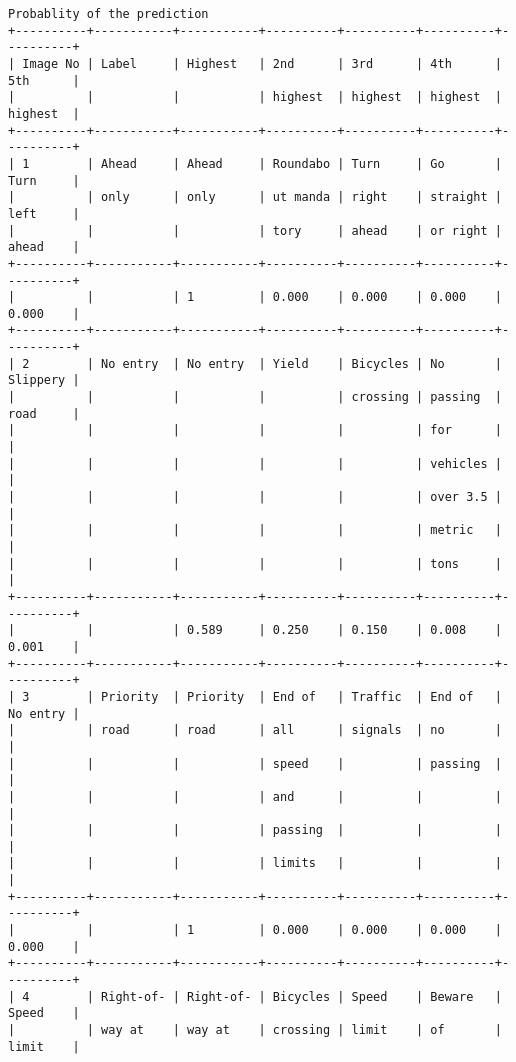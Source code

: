 \documentclass[11pt]{article}
\begin{document}
    \begin{Verbatim}[commandchars=\\\{\}]
Probablity of the prediction
+----------+-----------+-----------+----------+----------+----------+----------+
| Image No | Label     | Highest   | 2nd      | 3rd      | 4th      | 5th      |
|          |           |           | highest  | highest  | highest  | highest  |
+----------+-----------+-----------+----------+----------+----------+----------+
| 1        | Ahead     | Ahead     | Roundabo | Turn     | Go       | Turn     |
|          | only      | only      | ut manda | right    | straight | left     |
|          |           |           | tory     | ahead    | or right | ahead    |
+----------+-----------+-----------+----------+----------+----------+----------+
|          |           | 1         | 0.000    | 0.000    | 0.000    | 0.000    |
+----------+-----------+-----------+----------+----------+----------+----------+
| 2        | No entry  | No entry  | Yield    | Bicycles | No       | Slippery |
|          |           |           |          | crossing | passing  | road     |
|          |           |           |          |          | for      |          |
|          |           |           |          |          | vehicles |          |
|          |           |           |          |          | over 3.5 |          |
|          |           |           |          |          | metric   |          |
|          |           |           |          |          | tons     |          |
+----------+-----------+-----------+----------+----------+----------+----------+
|          |           | 0.589     | 0.250    | 0.150    | 0.008    | 0.001    |
+----------+-----------+-----------+----------+----------+----------+----------+
| 3        | Priority  | Priority  | End of   | Traffic  | End of   | No entry |
|          | road      | road      | all      | signals  | no       |          |
|          |           |           | speed    |          | passing  |          |
|          |           |           | and      |          |          |          |
|          |           |           | passing  |          |          |          |
|          |           |           | limits   |          |          |          |
+----------+-----------+-----------+----------+----------+----------+----------+
|          |           | 1         | 0.000    | 0.000    | 0.000    | 0.000    |
+----------+-----------+-----------+----------+----------+----------+----------+
| 4        | Right-of- | Right-of- | Bicycles | Speed    | Beware   | Speed    |
|          | way at    | way at    | crossing | limit    | of       | limit    |

\end{Verbatim}
\end{document}
